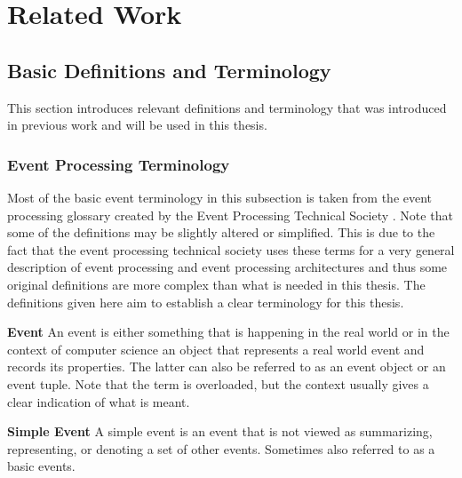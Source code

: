 
\chapter{Related Work}
\label{chapter_related}

\ifpdf
    \graphicspath{{Chapter2/Figs/Raster/}{Chapter2/Figs/PDF/}{Chapter2/Figs/}}
\else
    \graphicspath{{Chapter2/Figs/Vector/}{Chapter2/Figs/}}
\fi



\section{Basic Definitions and Terminology}
This section introduces relevant definitions and terminology that was introduced in previous work and will be used in this thesis.

\subsection{Event Processing Terminology}
Most of the basic event terminology in this subsection is taken from the event processing glossary created by the Event Processing Technical Society \cite{luckham2011epts}. Note that some of the definitions may be slightly altered or simplified. This is due to the fact that the event processing technical society uses these terms for a very general description of event processing and event processing architectures and thus some original definitions are more complex than what is needed in this thesis. The definitions given here aim to establish a clear terminology for this thesis.

\begin{mydef}
\textbf{Event} An event is either something that is happening in the real world or in the context of computer science an object that represents a real world event and records its properties. The latter can also be referred to as an event object or an event tuple. Note that the term is overloaded, but the context usually gives a clear indication of what is meant.
\end{mydef}

\begin{mydef}
\textbf{Simple Event} A simple event is an event that is not viewed as summarizing, representing, or denoting a set of other events. Sometimes also referred to as a basic events.
\end{mydef}

